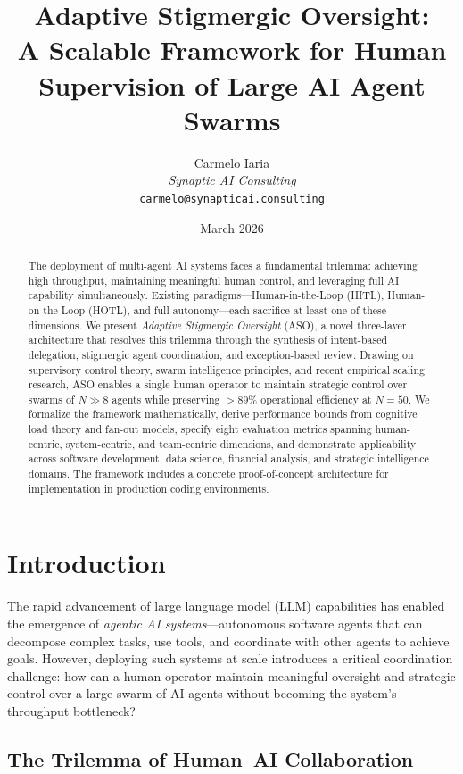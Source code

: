 \documentclass[11pt]{article}
\title{Adaptive Stigmergic Oversight:\\
A Scalable Framework for Human Supervision of Large AI Agent Swarms}
\author{Carmelo Iaria\\
\textit{Synaptic AI Consulting}\\
\texttt{carmelo@synapticai.consulting}}
\date{March 2026}
\begin{document}
\maketitle

\begin{abstract}
The deployment of multi-agent AI systems faces a fundamental trilemma: achieving high throughput, maintaining meaningful human control, and leveraging full AI capability simultaneously. Existing paradigms---Human-in-the-Loop (HITL), Human-on-the-Loop (HOTL), and full autonomy---each sacrifice at least one of these dimensions. We present \emph{Adaptive Stigmergic Oversight} (ASO), a novel three-layer architecture that resolves this trilemma through the synthesis of intent-based delegation, stigmergic agent coordination, and exception-based review. Drawing on supervisory control theory, swarm intelligence principles, and recent empirical scaling research, ASO enables a single human operator to maintain strategic control over swarms of $N \gg 8$ agents while preserving $>89\%$ operational efficiency at $N=50$. We formalize the framework mathematically, derive performance bounds from cognitive load theory and fan-out models, specify eight evaluation metrics spanning human-centric, system-centric, and team-centric dimensions, and demonstrate applicability across software development, data science, financial analysis, and strategic intelligence domains. The framework includes a concrete proof-of-concept architecture for implementation in production coding environments.
\end{abstract}

\section{Introduction}

The rapid advancement of large language model (LLM) capabilities has enabled the emergence of \emph{agentic AI systems}---autonomous software agents that can decompose complex tasks, use tools, and coordinate with other agents to achieve goals. However, deploying such systems at scale introduces a critical coordination challenge: how can a human operator maintain meaningful oversight and strategic control over a large swarm of AI agents without becoming the system's throughput bottleneck?

\subsection{The Trilemma of Human--AI Collaboration}
\end{document}
